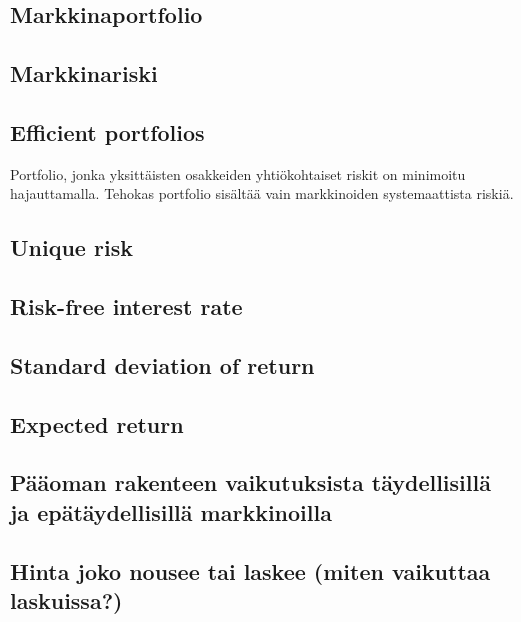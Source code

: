 \documentclass[a4paper]{article}
\begin{document}
\subsection{Markkinaportfolio}

\subsection{Markkinariski}

\subsection{Efficient portfolios}

Portfolio, jonka yksittäisten osakkeiden yhtiökohtaiset riskit on minimoitu hajauttamalla. Tehokas portfolio sisältää vain markkinoiden systemaattista riskiä.

\subsection{Unique risk}

\subsection{Risk-free interest rate}

\subsection{Standard deviation of return}

\subsection{Expected return}

\subsection{Pääoman rakenteen vaikutuksista täydellisillä ja epätäydellisillä markkinoilla}

\subsection{Hinta joko nousee tai laskee (miten vaikuttaa laskuissa?)}

\end{document}
